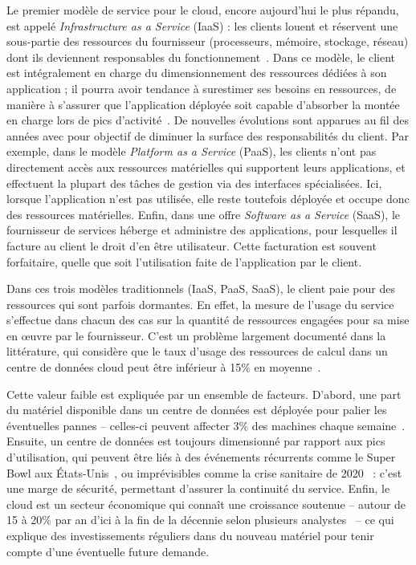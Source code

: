 Le premier modèle de service pour le cloud, encore aujourd'hui le plus répandu, est appelé \textit{Infrastructure as a Service} (IaaS) : les clients louent et réservent une sous-partie des ressources du fournisseur (processeurs, mémoire, stockage, réseau) dont ils deviennent responsables du fonctionnement~\cite{mellNISTDefinitionCloud}. Dans ce modèle, le client est intégralement en charge du dimensionnement des ressources dédiées à son application ; il pourra avoir tendance à surestimer ses besoins en ressources, de manière à s'assurer que l'application déployée soit capable d'absorber la montée en charge lors de pics d'activité~\cite{takMoveNotMove}. De nouvelles évolutions sont apparues au fil des années avec pour objectif de diminuer la surface des responsabilités du client. Par exemple, dans le modèle \textit{Platform as a Service} (PaaS), les clients n'ont pas directement accès aux ressources matérielles qui supportent leurs applications, et effectuent la plupart des tâches de gestion via des interfaces spécialisées. Ici, lorsque l'application n'est pas utilisée, elle reste toutefois déployée et occupe donc des ressources matérielles. Enfin, dans une offre \textit{Software as a Service} (SaaS), le fournisseur de services héberge et administre des applications, pour lesquelles il facture au client le droit d'en être utilisateur. Cette facturation est souvent forfaitaire, quelle que soit l'utilisation faite de l'application par le client.

Dans ces trois modèles traditionnels (IaaS, PaaS, SaaS), le client paie pour des ressources qui sont parfois dormantes. En effet, la mesure de l'usage du service s'effectue dans chacun des cas sur la quantité de ressources engagées pour sa mise en œuvre par le fournisseur. C'est un problème largement documenté dans la littérature, qui considère que le taux d'usage des ressources de calcul dans un centre de données cloud peut être inférieur à 15\% en moyenne~\cite{vasanWorthTheirWatts2010, vermaLargescaleClusterManagement2015a}.

Cette valeur faible est expliquée par un ensemble de facteurs. D'abord, une part du matériel disponible dans un centre de données est déployée pour palier les éventuelles pannes -- celles-ci peuvent affecter 3\% des machines chaque semaine~\cite{BareMetal70B}. Ensuite, un centre de données est toujours dimensionné par rapport aux pics d'utilisation, qui peuvent être liés à des événements récurrents comme le Super Bowl aux États-Unis~\cite{wangTouchdownCloudImpact2019}, ou imprévisibles comme la crise sanitaire de 2020~\cite{alashhabImpactCoronavirusPandemic2021} : c'est une marge de sécurité, permettant d'assurer la continuité du service. Enfin, le cloud est un secteur économique qui connaît une croissance soutenue -- autour de 15 à 20\% par an d'ici à la fin de la décennie selon plusieurs analystes~\cite{CloudComputingMarket, WorldwideSpendingPublic} -- ce qui explique des investissements réguliers dans du nouveau matériel pour tenir compte d'une éventuelle future demande.

